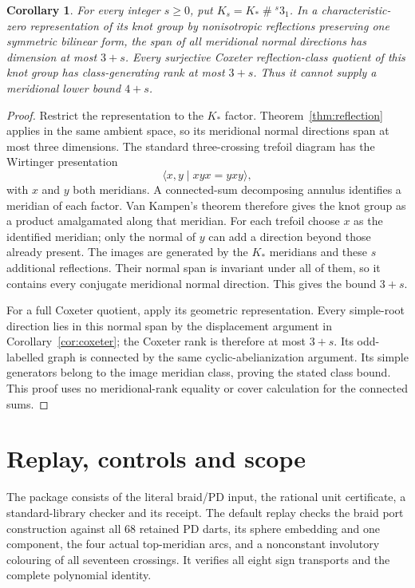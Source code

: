 \documentclass[11pt]{article}
\newtheorem{corollary}[theorem]{Corollary}
\begin{document}
\begin{corollary}\label{cor:sums}
For every integer $s\ge0$, put $K_s=K_*\mathbin{\#}{}^s3_1$.
In a characteristic-zero representation of its knot group by
nonisotropic reflections preserving one symmetric bilinear form,
the span of all meridional normal directions has dimension at most
$3+s$. Every surjective Coxeter reflection-class quotient of this
knot group has class-generating rank at most $3+s$.
Thus it cannot supply a meridional lower bound $4+s$.
\end{corollary}
\begin{proof}
Restrict the representation to the $K_*$ factor.
Theorem~\ref{thm:reflection} applies in the same ambient space, so
its meridional normal directions span at most three dimensions.
The standard three-crossing trefoil diagram has the Wirtinger
presentation
\[
                  \langle x,y\mid xyx=yxy\rangle ,
\]
with $x$ and $y$ both meridians. A connected-sum decomposing annulus
identifies a meridian of each factor. Van Kampen's theorem therefore
gives the knot group as a product amalgamated along that meridian.
For each trefoil choose $x$ as the identified meridian; only the
normal of $y$ can add a direction beyond those already present.
The images are generated by the $K_*$ meridians and these $s$
additional reflections. Their normal span is invariant under all
of them, so it contains every conjugate meridional normal direction.
This gives the bound $3+s$.

For a full Coxeter quotient, apply its geometric representation.
Every simple-root direction lies in this normal span by the
displacement argument in Corollary~\ref{cor:coxeter}; the Coxeter
rank is therefore at most $3+s$. Its odd-labelled graph is connected
by the same cyclic-abelianization argument. Its simple generators
belong to the image meridian class, proving the stated class bound.
This proof uses no meridional-rank equality or cover calculation for
the connected sums.
\end{proof}

\section{Replay, controls and scope}
The package consists of the literal braid/PD input,
the rational unit certificate, a standard-library checker and its
receipt. The default replay checks the braid port construction
against all $68$ retained PD darts, its sphere embedding and one
component, the four actual top-meridian arcs, and a nonconstant
involutory colouring of all seventeen crossings. It verifies all
eight sign transports and the complete polynomial identity.
\end{document}
